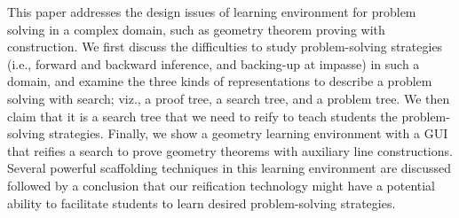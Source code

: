 This paper addresses the design issues of learning environment for
problem solving in a complex domain, such as geometry theorem proving
with construction.  We first discuss the difficulties to study
problem-solving strategies (i.e., forward and backward inference, and
backing-up at impasse) in such a domain, and examine the three kinds of
representations to describe a problem solving with search; viz., a proof
tree, a search tree, and a problem tree.  We then claim that it is a
search tree that we need to reify to teach students the problem-solving
strategies.  Finally, we show a geometry learning environment with a GUI
that reifies a search to prove geometry theorems with auxiliary line
constructions.  Several powerful scaffolding techniques in this learning
environment are discussed followed by a conclusion that our reification
technology might have a potential ability to facilitate students to
learn desired problem-solving strategies.

